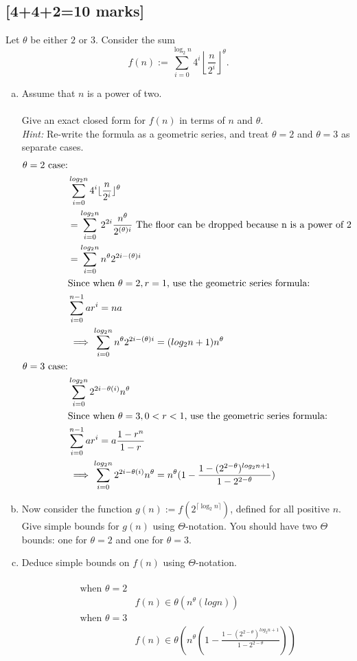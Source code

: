 \documentclass[12pt]{article}
\DeclarePairedDelimiter\floor{\lfloor}{\rfloor}
\begin{document}
\subsection{[4+4+2=10 marks]}
Let $\theta$ be either $2$ or $3$. 
Consider the sum
$$f(n) := \sum_{i=0}^{\log_2 n} 4^i \left \lfloor \frac{n}{2^i} \right \rfloor ^{\theta}.$$
\begin{enumerate}[(a)]
\item Assume that $n$ is a power of two.\\
\\
Give an exact closed form for $f(n)$ in terms of $n$
and $\theta$.\\{\em Hint:} Re-write the formula as a geometric series,
and treat $\theta=2$ and $\theta=3$
as separate cases.
\begin{align*}
  \theta = 2 \text{ case:}\\
  & \sum_{i=0}^{log_2n} 4^i \floor{\frac{n}{2^i}}^\theta\\
  &= \sum_{i=0}^{log_2n} 2^{2i} \frac{n^\theta}{2^{(\theta)i}} \text{ The floor can be dropped because n is a power of 2}\\
  &= \sum_{i=0}^{log_2n}n^\theta2^{2i-(\theta)i}\\
  &\text{Since when }\theta = 2, r = 1\text{, use the geometric series formula:}\\
  &\sum_{i=0}^{n-1}ar^i = na\\
  &\implies \sum_{i=0}^{log_2n}n^\theta2^{2i-(\theta)i} = (log_2n + 1)n^\theta\\
  \theta = 3 \text{ case:}\\
  &\sum_{i=0}^{log_2n} 2^{2i-\theta(i)}n^\theta\\
  &\text{Since when }\theta = 3, 0 < r < 1\text{, use the geometric series formula:}\\
  &\sum_{i=0}^{n-1}ar^i = a\frac{1-r^n}{1-r}\\
  &\implies \sum_{i=0}^{log_2n} 2^{2i-\theta(i)}n^\theta = n^\theta(1 - \frac{1 - (2^{2 - \theta})^{log_2n + 1}}{1 - 2^{2-\theta}})\\
\end{align*}
\item Now consider the function $g(n) := f(2^{\lceil \log_2 n\rceil})$, 
defined for all positive $n$. Give simple bounds for $g(n)$
using $\Theta$-notation. You should have two $\Theta$ bounds: 
one for $\theta=2$ and one for $\theta = 3$.
\item Deduce simple bounds on $f(n)$ using $\Theta$-notation.\\
\\
\begin{align*}
\text{ when } \theta = 2\\
&f(n) \in \theta (n^\theta(logn))\\
\text{ when } \theta = 3\\
&f(n) \in \theta (n^\theta(1 - \frac{1 - (2^{2 - \theta})^{log_2n + 1}}{1 - 2^{2-\theta}}))
\end{align*}
\end{enumerate}
\end{document}
